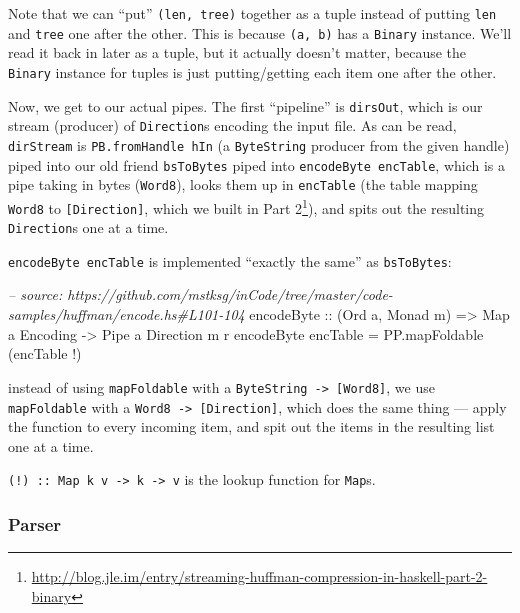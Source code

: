 \documentclass[]{article}
\newenvironment{Shaded}{}{}
\newcommand{\DataTypeTok}[1]{\textcolor[rgb]{0.56,0.13,0.00}{{#1}}}
\newcommand{\CommentTok}[1]{\textcolor[rgb]{0.38,0.63,0.69}{\textit{{#1}}}}
\newcommand{\OtherTok}[1]{\textcolor[rgb]{0.00,0.44,0.13}{{#1}}}
\newcommand{\FunctionTok}[1]{\textcolor[rgb]{0.02,0.16,0.49}{{#1}}}
\newcommand{\NormalTok}[1]{{#1}}
\renewcommand{\href}[2]{#2\footnote{\url{#1}}}
\begin{document}
Note that we can ``put'' \texttt{(len,\ tree)} together as a tuple instead of
putting \texttt{len} and \texttt{tree} one after the other. This is because
\texttt{(a,\ b)} has a \texttt{Binary} instance. We'll read it back in later as
a tuple, but it actually doesn't matter, because the \texttt{Binary} instance
for tuples is just putting/getting each item one after the other.

Now, we get to our actual pipes. The first ``pipeline'' is \texttt{dirsOut},
which is our stream (producer) of \texttt{Direction}s encoding the input file.
As can be read, \texttt{dirStream} is \texttt{PB.fromHandle\ hIn} (a
\texttt{ByteString} producer from the given handle) piped into our old friend
\texttt{bsToBytes} piped into \texttt{encodeByte\ encTable}, which is a pipe
taking in bytes (\texttt{Word8}), looks them up in \texttt{encTable} (the table
mapping \texttt{Word8} to \texttt{{[}Direction{]}}, which we built in
\href{http://blog.jle.im/entry/streaming-huffman-compression-in-haskell-part-2-binary}{Part
2}), and spits out the resulting \texttt{Direction}s one at a time.

\texttt{encodeByte\ encTable} is implemented ``exactly the same'' as
\texttt{bsToBytes}:

\begin{Shaded}
\begin{Highlighting}[]
\CommentTok{-- source: https://github.com/mstksg/inCode/tree/master/code-samples/huffman/encode.hs#L101-104}
\OtherTok{encodeByte ::} \NormalTok{(}\DataTypeTok{Ord} \NormalTok{a, }\DataTypeTok{Monad} \NormalTok{m)}
           \OtherTok{=>} \DataTypeTok{Map} \NormalTok{a }\DataTypeTok{Encoding}
           \OtherTok{->} \DataTypeTok{Pipe} \NormalTok{a }\DataTypeTok{Direction} \NormalTok{m r}
\NormalTok{encodeByte encTable }\FunctionTok{=} \NormalTok{PP.mapFoldable (encTable }\FunctionTok{!}\NormalTok{)}
\end{Highlighting}
\end{Shaded}

instead of using \texttt{mapFoldable} with a
\texttt{ByteString\ -\textgreater{}\ {[}Word8{]}}, we use \texttt{mapFoldable}
with a \texttt{Word8\ -\textgreater{}\ {[}Direction{]}}, which does the same
thing --- apply the function to every incoming item, and spit out the items in
the resulting list one at a time.

\texttt{(!)\ ::\ Map\ k\ v\ -\textgreater{}\ k\ -\textgreater{}\ v} is the
lookup function for \texttt{Map}s.

\subsubsection{Parser}\label{parser}
\end{document}
